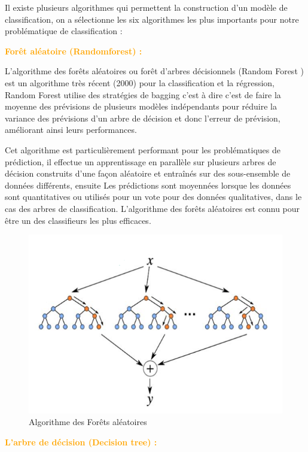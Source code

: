 Il existe plusieurs algorithmes qui permettent la construction d'un modèle de classification, on  a sélectionne les six algorithmes les plus importants pour notre problématique de classification : 

   	
\textcolor{Orange}{\textbf{Forêt aléatoire (Randomforest) :}}

L’algorithme des forêts aléatoires ou forêt d’arbres décisionnels (Random Forest ) est un algorithme très récent (2000) pour la  classification et la régression, Random Forest utilise des stratégies de bagging c'est à dire c’est de faire la moyenne des prévisions de plusieurs modèles indépendants pour réduire la variance des prévisions d'un arbre de décision et donc l’erreur de prévision, améliorant ainsi leurs performances.

Cet algorithme est particulièrement performant pour les problématiques de prédiction, il effectue un apprentissage en parallèle sur plusieurs arbres de décision construits d'une façon aléatoire et entraînés sur des sous-ensemble de données différents, ensuite Les prédictions sont moyennées lorsque les données sont quantitatives ou utilisés pour un vote pour des données qualitatives, dans le cas des arbres de classification. L’algorithme des forêts aléatoires est connu pour être un des classifieurs les plus efficaces\cite{RF}.


\begin{figure}[H]
\begin{center}
\includegraphics[width=0.8\linewidth]{images/randomforest.png}
\end{center}
\caption{Algorithme des Forêts aléatoires}
\label{fig:8}
\end{figure}

\textcolor{Orange}{\textbf{L'arbre de décision (Decision tree) : }}

